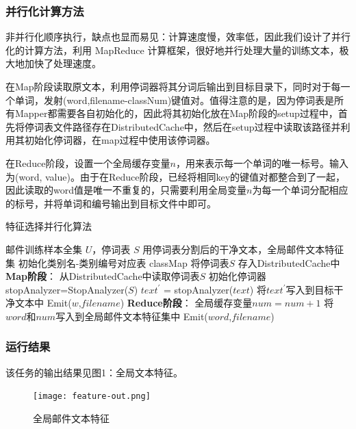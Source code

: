 \documentclass[lang=cn,11pt]{elegantpaper}
\begin{document}
\subsubsection{并行化计算方法}
非并行化顺序执行，缺点也显而易见：计算速度慢，效率低，因此我们设计了并行化的计算方法，利用 MapReduce 计算框架，很好地并行处理大量的训练文本，极大地加快了处理速度。\par
在Map阶段读取原文本，利用停词器将其分词后输出到目标目录下，同时对于每一个单词，发射(word,filename-classNum)键值对。值得注意的是，因为停词表是所有Mapper都需要各自初始化的，因此将其初始化放在Map阶段的setup过程中，首先将停词表文件路径存在DistributedCache中，然后在setup过程中读取该路径并利用其初始化停词器，在map过程中使用该停词器。\par
在Reduce阶段，设置一个全局缓存变量$n$，用来表示每一个单词的唯一标号。输入为(word, value)。由于在Reduce阶段，已经将相同key的键值对都整合到了一起，因此读取的word值是唯一不重复的，只需要利用全局变量$n$为每一个单词分配相应的标号，并将单词和编号输出到目标文件中即可。\par
\begin{algorithm}[H]  
  \caption{特征选择并行化算法}  
  \label{alg:Framwork}
  \begin{algorithmic}[1]
    \Require
    邮件训练样本全集 $U$，停词表 $S$
    \Ensure 
    用停词表分割后的干净文本，全局邮件文本特征集
    \State 初始化类别名-类别编号对应表 classMap
    \State 将停词表$S$ 存入DistributedCache中
    \State \textbf{Map阶段}：
    \State 从DistributedCache中读取停词表$S$
    \State 初始化停词器 stopAnalyzer=StopAnalyzer($S$)
    \EndFunction
      \State $text^\prime$ = stopAnalyzer($text$)
      \State 将$text^\prime$写入到目标干净文本中
        \State Emit($w$,$filename$)
      \EndFor
    \EndFunction
    \State \textbf{Reduce阶段}：
      \State 全局缓存变量$num=num+1$
      \State 将$word$和$num$写入到全局邮件文本特征集中
      \State Emit($word$,$filename$)
    \EndFunction
  \end{algorithmic}
\end{algorithm}

\subsubsection{运行结果}
该任务的输出结果见图1：全局文本特征。
\begin{figure}[H]
	\centering
	\texttt{[image: feature-out.png]}
	\caption{全局邮件文本特征 \label{fig:feature-out}}
\end{figure}
\end{document}
